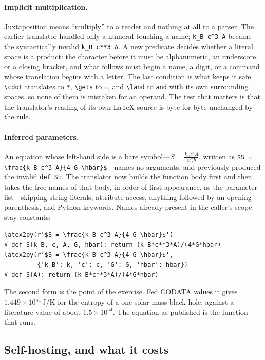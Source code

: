 \documentclass[11pt]{article}
\begin{document}
\paragraph{Implicit multiplication.} Juxtaposition means ``multiply'' to a reader
and nothing at all to a parser. The earlier translator handled only a numeral
touching a name; \verb|k_B c^3 A| became the syntactically invalid
\verb|k_B c**3 A|. A new predicate decides whether a literal space is a product:
the character before it must be alphanumeric, an underscore, or a closing
bracket, and what follows must begin a name, a digit, or a command whose
translation begins with a letter. The last condition is what keeps it safe.
\verb|\cdot| translates to \verb|*|, \verb|\gets| to \verb|=|, and \verb|\land|
to \verb|and| with its own surrounding spaces, so none of them is mistaken for
an operand. The test that matters is that the translator's reading of its own
\LaTeX{} source is byte-for-byte unchanged by the rule.

\paragraph{Inferred parameters.} An equation whose left-hand side is a bare
symbol---$S = \frac{k_B c^3 A}{4 G \hbar}$, written as
\verb|$S = \frac{k_B c^3 A}{4 G \hbar}$|---names no arguments, and
previously produced the invalid \verb|def S:|. The translator now builds the
function body first and then takes the free names of that body, in order of
first appearance, as the parameter list---skipping string literals, attribute
access, anything followed by an opening parenthesis, and Python keywords.
Names already present in the caller's scope stay constants:
\begin{lstlisting}
latex2py(r'$S = \frac{k_B c^3 A}{4 G \hbar}$')
# def S(k_B, c, A, G, hbar): return (k_B*c**3*A)/(4*G*hbar)
latex2py(r'$S = \frac{k_B c^3 A}{4 G \hbar}$',
         {'k_B': k, 'c': c, 'G': G, 'hbar': hbar})
# def S(A): return (k_B*c**3*A)/(4*G*hbar)
\end{lstlisting}
The second form is the point of the exercise. Fed CODATA values it gives
$1.449\times10^{54}$\,J/K for the entropy of a one-solar-mass black hole,
against a literature value of about $1.5\times10^{54}$. The equation as
published is the function that runs.

\subsection{Self-hosting, and what it costs}
\end{document}
